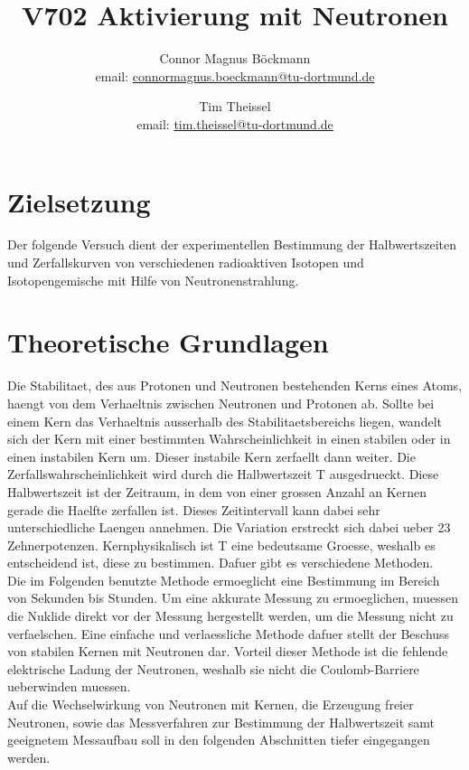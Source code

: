 \documentclass[titlepage=firstcover, captions=tableheading]{scrartcl}
\title{V702 Aktivierung mit Neutronen}
\author{
Connor Magnus Böckmann \\ email: \href{mailto:connormagnus.boeckmann@tu-dortmund.de}{connormagnus.boeckmann@tu-dortmund.de}
\and Tim Theissel \\ email: \href{mailto:tim.theissel@tu-dortmund.de}{tim.theissel@tu-dortmund.de}}
\begin{document}
\maketitle
\newpage
\tableofcontents
\newpage
\section{Zielsetzung}
Der folgende Versuch dient der experimentellen Bestimmung der Halbwertszeiten und Zerfallskurven von verschiedenen radioaktiven Isotopen und Isotopengemische mit Hilfe von Neutronenstrahlung.
\section{Theoretische Grundlagen}
Die Stabilitaet, des aus Protonen und Neutronen bestehenden Kerns eines Atoms, haengt von dem Verhaeltnis zwischen Neutronen und Protonen ab. Sollte bei einem Kern das Verhaeltnis ausserhalb des Stabilitaetsbereichs liegen, wandelt sich der Kern mit einer bestimmten Wahrscheinlichkeit in einen stabilen oder in einen instabilen Kern um. Dieser instabile Kern zerfaellt dann weiter. Die Zerfallswahrscheinlichkeit wird durch die Halbwertszeit T ausgedrueckt. Diese Halbwertszeit ist der Zeitraum, in dem von einer grossen Anzahl an Kernen gerade die Haelfte zerfallen ist. Dieses Zeitintervall kann dabei sehr unterschiedliche Laengen annehmen. Die Variation erstreckt sich dabei ueber 23 Zehnerpotenzen. Kernphysikalisch ist T eine bedeutsame Groesse, weshalb es entscheidend ist, diese zu bestimmen. Dafuer gibt es verschiedene Methoden.\\
Die im Folgenden benutzte Methode ermoeglicht eine Bestimmung im Bereich von Sekunden bis Stunden. Um eine akkurate Messung zu ermoeglichen, muessen die Nuklide direkt vor der Messung hergestellt werden, um die Messung nicht zu verfaelschen. Eine einfache und verlaessliche Methode dafuer stellt der Beschuss von stabilen Kernen mit Neutronen dar. Vorteil dieser Methode ist die fehlende elektrische Ladung der Neutronen, weshalb sie nicht die Coulomb-Barriere ueberwinden muessen. \\
Auf die Wechselwirkung von Neutronen mit Kernen, die Erzeugung freier Neutronen, sowie das Messverfahren zur Bestimmung der Halbwertszeit samt geeignetem Messaufbau soll in den folgenden Abschnitten tiefer eingegangen werden.
\end{document}

